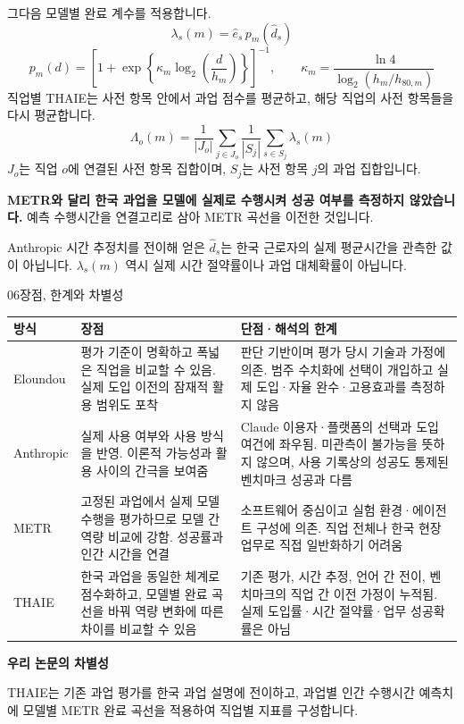 \documentclass[11pt,a4paper]{article}
\newcommand{\pagetitle}[2]{{\small\sffamily\color{ink}#1\par}\vspace{3mm}{\LARGE\bfseries #2\par}\vspace{4mm}}
\begin{document}
그다음 모델별 완료 계수를 적용합니다.
\[
\boxed{\lambda_s(m)=\hat e_s\,p_m(\hat d_s)}
\]
\[
p_m(d)=\left[1+\exp\left\{
\kappa_m\log_2\left(\frac{d}{h_m}\right)\right\}\right]^{-1},
\qquad
\kappa_m=\frac{\ln4}{\log_2(h_m/h_{80,m})}
\]
직업별 THAIE는 사전 항목 안에서 과업 점수를 평균하고, 해당 직업의 사전 항목들을 다시 평균합니다.
\[
\Lambda_o(m)=\frac1{|J_o|}\sum_{j\in J_o}
\frac1{|S_j|}\sum_{s\in S_j}\lambda_s(m)
\]
$J_o$는 직업 $o$에 연결된 사전 항목 집합이며, $S_j$는 사전 항목 $j$의 과업 집합입니다.

\textbf{METR와 달리 한국 과업을 모델에 실제로 수행시켜 성공 여부를 측정하지 않았습니다.} 예측 수행시간을 연결고리로 삼아 METR 곡선을 이전한 것입니다.

Anthropic 시간 추정치를 전이해 얻은 $\hat d_s$는 한국 근로자의 실제 평균시간을 관측한 값이 아닙니다. $\lambda_s(m)$ 역시 실제 시간 절약률이나 과업 대체확률이 아닙니다.

\newpage
\pagetitle{06\quad 장점, 한계와 차별성}{무엇을 주장할 수 있는가}
{\small
\begin{tabularx}{\textwidth}{L{25mm}XX}
\toprule
방식 & 장점 & 단점·해석의 한계\\\midrule
Eloundou & 평가 기준이 명확하고 폭넓은 직업을 비교할 수 있음. 실제 도입 이전의 잠재적 활용 범위도 포착 & 판단 기반이며 평가 당시 기술과 가정에 의존. 범주 수치화에 선택이 개입하고 실제 도입·자율 완수·고용효과를 측정하지 않음\\\addlinespace
Anthropic & 실제 사용 여부와 사용 방식을 반영. 이론적 가능성과 활용 사이의 간극을 보여줌 & Claude 이용자·플랫폼의 선택과 도입 여건에 좌우됨. 미관측이 불가능을 뜻하지 않으며, 사용 기록상의 성공도 통제된 벤치마크 성공과 다름\\\addlinespace
METR & 고정된 과업에서 실제 모델 수행을 평가하므로 모델 간 역량 비교에 강함. 성공률과 인간 시간을 연결 & 소프트웨어 중심이고 실험 환경·에이전트 구성에 의존. 직업 전체나 한국 현장 업무로 직접 일반화하기 어려움\\\addlinespace
THAIE & 한국 과업을 동일한 체계로 점수화하고, 모델별 완료 곡선을 바꿔 역량 변화에 따른 차이를 비교할 수 있음 & 기존 평가, 시간 추정, 언어 간 전이, 벤치마크의 직업 간 이전 가정이 누적됨. 실제 도입률·시간 절약률·업무 성공확률은 아님\\\bottomrule
\end{tabularx}}

\textbf{우리 논문의 차별성}\par
THAIE는 기존 과업 평가를 한국 과업 설명에 전이하고, 과업별 인간 수행시간 예측치에 모델별 METR 완료 곡선을 적용하여 직업별 지표를 구성합니다.
\end{document}
